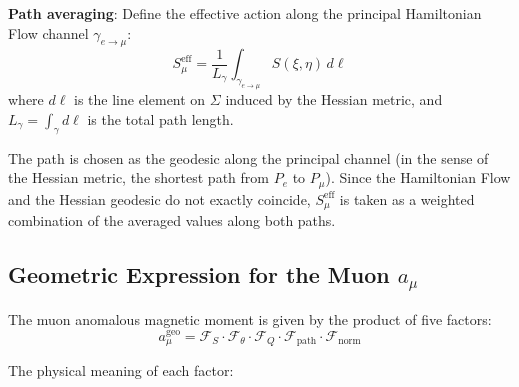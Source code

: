 \documentclass[aps,prd,reprint,nofootinbib]{revtex4-2}
\begin{document}
\textbf{Path averaging}: Define the effective action along the principal Hamiltonian Flow channel $\gamma_{e\to\mu}$:
\begin{equation}
S_\mu^{\text{eff}} = \frac{1}{L_\gamma} \int_{\gamma_{e\to\mu}} S(\xi, \eta) \, d\ell \label{eq:path_avg}
\end{equation}
where $d\ell$ is the line element on $\Sigma$ induced by the Hessian metric, and $L_\gamma = \int_\gamma d\ell$ is the total path length.

The path is chosen as the geodesic along the principal channel (in the sense of the Hessian metric, the shortest path from $P_e$ to $P_\mu$). Since the Hamiltonian Flow and the Hessian geodesic do not exactly coincide, $S_\mu^{\text{eff}}$ is taken as a weighted combination of the averaged values along both paths.

\subsection{Geometric Expression for the Muon $a_\mu$}

The muon anomalous magnetic moment is given by the product of five factors:
\begin{equation}
a_\mu^{\text{geo}} = \mathcal{F}_S \cdot \mathcal{F}_\theta \cdot \mathcal{F}_Q \cdot \mathcal{F}_{\text{path}} \cdot \mathcal{F}_{\text{norm}} \label{eq:five_factor}
\end{equation}

The physical meaning of each factor:
\end{document}
